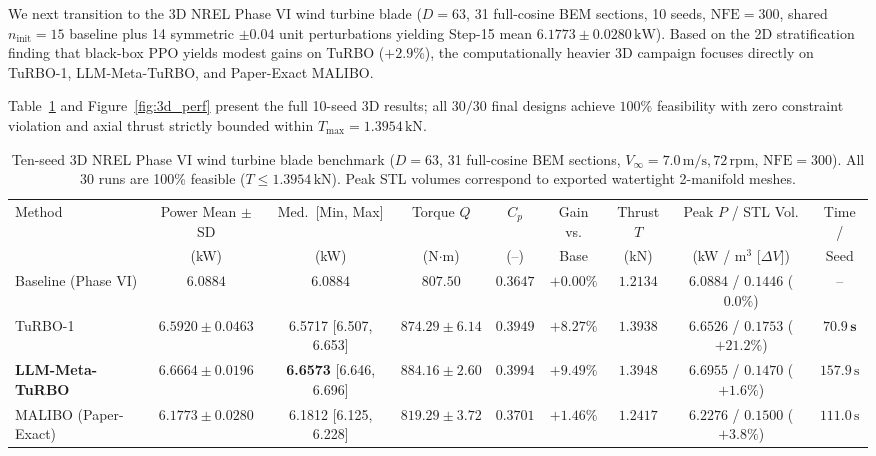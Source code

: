 \documentclass[11pt,fleqn,letterpaper]{article}
\begin{document}
We next transition to the 3D NREL Phase VI wind turbine blade ($D=63$, 31 full-cosine BEM sections, 10 seeds, $\text{NFE}=300$, shared $n_{\text{init}}=15$ baseline plus 14 symmetric $\pm 0.04$ unit perturbations yielding Step-15 mean $6.1773 \pm 0.0280\,\text{kW}$). Based on the 2D stratification finding that black-box PPO yields modest gains on TuRBO ($+2.9\%$), the computationally heavier 3D campaign focuses directly on TuRBO-1, LLM-Meta-TuRBO, and Paper-Exact MALIBO.

Table~\ref{tab:3d_results} and Figure~\ref{fig:3d_perf} present the full 10-seed 3D results; all $30/30$ final designs achieve $100\%$ feasibility with zero constraint violation and axial thrust strictly bounded within $T_{\max} = 1.3954\,\text{kN}$.

\begin{table}[t]
\centering
\caption{Ten-seed 3D NREL Phase VI wind turbine blade benchmark ($D=63$, 31 full-cosine BEM sections, $V_\infty=7.0\,\text{m/s}, 72\,\text{rpm}$, $\text{NFE}=300$). All 30 runs are 100\% feasible ($T \le 1.3954\,\text{kN}$). Peak STL volumes correspond to exported watertight 2-manifold meshes.}
\label{tab:3d_results}
\vspace{1mm}
\scriptsize
\setlength{\tabcolsep}{3.5pt}
\begin{tabular}{@{}l c c c c c c c c@{}}
\toprule
Method & Power Mean $\pm$ SD & Med.\ [Min, Max] & Torque $Q$ & $C_p$ & Gain vs. & Thrust $T$ & Peak $P$ / STL Vol. & Time / \\
 & (kW) & (kW) & (N$\cdot$m) & (--) & Base & (kN) & (kW / $\text{m}^3$ [$\Delta V$]) & Seed \\
\midrule
Baseline (Phase VI) & $6.0884$ & $6.0884$ & $807.50$ & $0.3647$ & $+0.00\%$ & $1.2134$ & $6.0884$ / $0.1446$ ($0.0\%$) & -- \\
TuRBO-1 & $6.5920 \pm 0.0463$ & 6.5717 [6.507, 6.653] & $874.29 \pm 6.14$ & $0.3949$ & $+8.27\%$ & $1.3938$ & $6.6526$ / $0.1753$ ($+21.2\%$) & $\mathbf{70.9\,\text{s}}$ \\
\textbf{LLM-Meta-TuRBO} & $\mathbf{6.6664 \pm 0.0196}$ & \textbf{6.6573} [6.646, 6.696] & $\mathbf{884.16 \pm 2.60}$ & $\mathbf{0.3994}$ & $\mathbf{+9.49\%}$ & $1.3948$ & $\mathbf{6.6955}$ / $\mathbf{0.1470}$ ($\mathbf{+1.6\%}$) & $157.9\,\text{s}$ \\
MALIBO (Paper-Exact) & $6.1773 \pm 0.0280$ & 6.1812 [6.125, 6.228] & $819.29 \pm 3.72$ & $0.3701$ & $+1.46\%$ & $1.2417$ & $6.2276$ / $0.1500$ ($+3.8\%$) & $111.0\,\text{s}$ \\
\bottomrule
\end{tabular}
\end{table}
\end{document}
